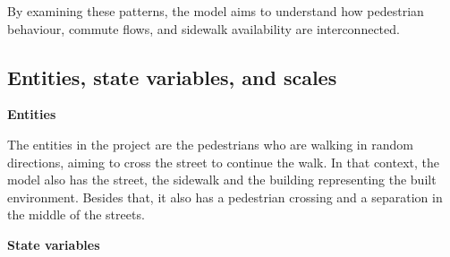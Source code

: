 \documentclass[10pt]{report}
\numberwithin{figure}{section}
\numberwithin{table}{section}
\begin{document}
By examining these patterns, the model aims to understand how pedestrian behaviour, commute flows, and sidewalk availability are interconnected.
\subsection{Entities, state variables, and scales}

\textbf{Entities}

The entities in the project are the pedestrians who are walking in random directions, aiming to cross the street to continue the walk. In that context, the model also has the street, the sidewalk and the building representing the built environment. Besides that, it also has a pedestrian crossing and a separation in the middle of the streets.


\textbf{State variables}
\end{document}
